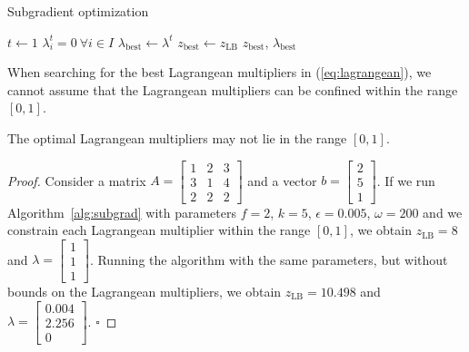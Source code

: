 \documentclass[runningheads]{llncs}
\begin{document}
\begin{algorithm}
  \DontPrintSemicolon
  \caption{Subgradient optimization}\label{alg:subgrad}
  $t \gets 1$\; 
  $\lambda_i^t = 0 ~ \forall i \in I$\;
  $\lambda_{\text{best}} \gets \lambda^t$\;
  $z_{\text{best}} \gets z_{\text{LB}}$\; 
  \Return $z_{\text{best}}$, $\lambda_{\text{best}}$
\end{algorithm}

When searching for the best Lagrangean multipliers in (\ref{eq:lagrangean}), we cannot assume that the Lagrangean multipliers can be confined within the range $[0, 1]$.

\begin{lemma}
  The optimal Lagrangean multipliers may not lie in the range $[0, 1]$.
\end{lemma}

\begin{proof}
  Consider a matrix $A = \begin{bmatrix}
    1 & 2 & 3\\
    3 & 1 & 4\\
    2 & 2 & 2
    \end{bmatrix}$ and a vector $b = \begin{bmatrix}2\\5\\1\end{bmatrix}$. If we run Algorithm~\ref{alg:subgrad} with parameters $f=2$, $k=5$, $\epsilon=0.005$, $\omega=200$ and we constrain each Lagrangean multiplier within the range $[0, 1]$, we obtain $z_{\text{LB}} = 8$ and $\lambda = \begin{bmatrix}1\\1\\1\end{bmatrix}$. Running the algorithm with the same parameters, but without bounds on the Lagrangean multipliers, we obtain $z_{\text{LB}} = 10.498$ and $\lambda = \begin{bmatrix}0.004\\2.256\\0\end{bmatrix}$. \hfill $\square$
\end{proof}
\end{document}
